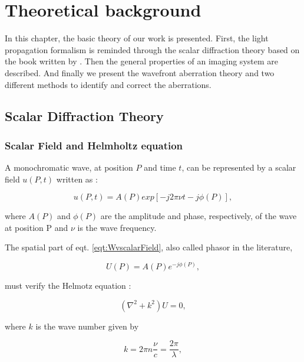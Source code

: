
\chapter{Theoretical background} 
\label{ch:THback}

In this chapter, the basic theory of our work is presented. First, the light propagation formalism is reminded through the scalar diffraction theory based on the book written by \citet{goodman_1968}. Then the general properties of an imaging system are described. And finally we present the wavefront aberration theory and two different methods to identify and correct the aberrations.

\section{Scalar Diffraction Theory}
\label{sec:ScaDifTh}

\subsection{Scalar Field and Helmholtz equation}
\label{subsec:ScalF_HelmEqt}

A monochromatic wave, at position $P$ and time $t$, can be represented by a scalar field $u(P,t)$ written as :

\begin{equation}
u(P,t) =  A(P) exp\left[-j2\pi\nu t - j\phi(P)\right],
\label{eqt:WvscalarField}
\end{equation}

where $A(P)$ and $\phi(P)$ are the amplitude and phase, respectively, of the wave at position P and $\nu$ is the wave frequency.

The spatial part of eqt. \eqref{eqt:WvscalarField}, also called  phasor  in the literature, 

\begin{equation}
U(P) = A(P)e^{-j\phi(P)},
\label{eqt:phasor}
\end{equation}

must verify the Helmotz equation : 

\begin{equation}
(\nabla^2 + k^2)U = 0,
\label{eqt:HelmholtzEqt}
\end{equation}

where $k$ is the wave number given by

\begin{equation}
k = 2\pi n \frac{\nu}{c} = \frac{2\pi}{\lambda},
\label{eqt:wavenumber}
\end{equation}

